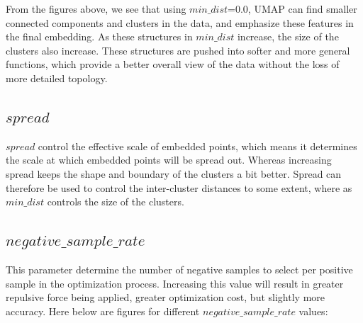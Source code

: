 \noindent From the figures above, we see that using $min\_dist$=0.0, UMAP can find smaller connected components and clusters in the data, and emphasize these features in the final embedding. As these structures in $min\_dist$ increase, the size of the clusters also increase. These structures are pushed into softer and more general functions, which provide a better overall view of the data without the loss of more detailed topology. 

\subsection{$spread$}

$spread$ control the effective scale of embedded points, which means it determines the scale at which embedded points will be spread out. Whereas increasing spread keeps the shape and boundary of the clusters a bit better. Spread can therefore be used to control the inter-cluster distances to some extent, where as $min\_dist$ controls the size of the clusters.

\subsection{$negative\_sample\_rate$}

This parameter determine the number of negative samples to select per positive sample in the optimization process. Increasing this value will result in greater repulsive force being applied, greater optimization cost, but slightly more accuracy. Here below are figures for different $negative\_sample\_rate$ values:


